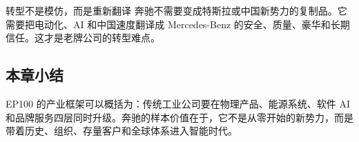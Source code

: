 \begin{importantbox}{转型不是模仿，而是重新翻译}
奔驰不需要变成特斯拉或中国新势力的复制品。它需要把电动化、AI 和中国速度翻译成 Mercedes-Benz 的安全、质量、豪华和长期信任。这才是老牌公司的转型难点。
\end{importantbox}

\subsection{本章小结}

EP100 的产业框架可以概括为：传统工业公司要在物理产品、能源系统、软件 AI 和品牌服务四层同时升级。奔驰的样本价值在于，它不是从零开始的新势力，而是带着历史、组织、存量客户和全球体系进入智能时代。

